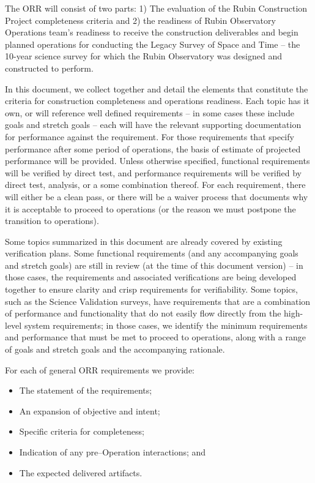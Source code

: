 The ORR will consist of two parts: 1) The evaluation of the Rubin Construction Project completeness criteria and 2) the readiness of Rubin Observatory Operations team's readiness to receive the construction deliverables and begin planned operations for conducting the Legacy Survey of Space and Time -- the 10-year science survey for which the Rubin Observatory was designed and constructed to perform.

In this document, we collect together and detail the elements that constitute the criteria for construction completeness and operations readiness. Each topic has it own, or will reference well defined requirements -- in some cases these include goals and stretch goals -- each will have the relevant supporting documentation for performance against the requirement. For those requirements that specify performance after some period of operations, the basis of estimate of projected performance will be provided. Unless otherwise specified, functional requirements will be verified by direct test, and performance requirements will be verified by direct test, analysis, or a some combination thereof.  For each requirement, there will either be a clean pass, or there will be a waiver process that documents why it is acceptable to proceed to operations (or the reason we must postpone the transition to operations).

Some topics summarized in this document are already covered by existing verification plans.  Some functional requirements (and any accompanying goals and stretch goals) are still in review (at the time of this document version) -- in those cases, the requirements and associated verifications are being developed together to ensure clarity and crisp requirements for verifiability. Some topics, such as the Science Validation surveys, have requirements that are a combination of performance and functionality that do not easily flow directly from the high-level system requirements; in those cases, we identify the minimum requirements and performance that must be met to proceed to operations, along with a range of goals and stretch goals and the accompanying rationale.

For each of general ORR requirements we provide:

\begin{itemize}
	\item The statement of the requirements;
	\item An expansion of objective and intent;
	\item Specific criteria for completeness;
	\item Indication of any pre--Operation interactions; and
	\item The expected delivered artifacts.
\end{itemize}
	